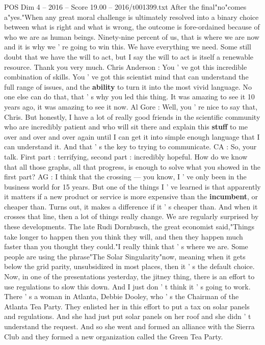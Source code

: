 \begin{textsample}{POS Dim 4 – 2016 – Score 19.00 – 2016/t001399.txt}
After the final"no"comes a"yes."When any great moral challenge is ultimately resolved into a binary choice between what is right and what is wrong, the outcome is fore-ordained because of who we are as human beings.
Ninety-nine percent of us, that is where we are now and it is why we ' re going to win this.
We have everything we need.
Some still doubt that we have the will to act, but I say the will to act is itself a renewable resource.
Thank you very much.
Chris Anderson : You ' ve got this incredible combination of skills.
You ' ve got this scientist mind that can understand the full range of issues, and the \textbf{ability} to turn it into the most vivid language.
No one else can do that, that ' s why you led this thing.
It was amazing to see it 10 years ago, it was amazing to see it now.
Al Gore : Well, you ' re nice to say that, Chris.
But honestly, I have a lot of really good friends in the scientific community who are incredibly patient and who will sit there and explain this \textbf{stuff} to me over and over and over again until I can get it into simple enough language that I can understand it.
And that ' s the key to trying to communicate.
CA : So, your talk.
First part : terrifying, second part : incredibly hopeful.
How do we know that all those graphs, all that progress, is enough to solve what you showed in the first part?
AG : I think that the crossing — you know, I ' ve only been in the business world for 15 years.
But one of the things I ' ve learned is that apparently it matters if a new product or service is more expensive than the \textbf{incumbent}, or cheaper than.
Turns out, it makes a difference if it ' s cheaper than.
And when it crosses that line, then a lot of things really change.
We are regularly surprised by these developments.
The late Rudi Dornbusch, the great economist said,"Things take longer to happen then you think they will, and then they happen much faster than you thought they could."I really think that ' s where we are.
Some people are using the phrase"The Solar Singularity"now, meaning when it gets below the grid parity, unsubsidized in most places, then it ' s the default choice.
Now, in one of the presentations yesterday, the jitney thing, there is an effort to use regulations to slow this down.
And I just don ' t think it ' s going to work.
There ' s a woman in Atlanta, Debbie Dooley, who ' s the Chairman of the Atlanta Tea Party.
They enlisted her in this effort to put a tax on solar panels and regulations.
And she had just put solar panels on her roof and she didn ' t understand the request.
And so she went and formed an alliance with the Sierra Club and they formed a new organization called the Green Tea Party.

\end{textsample}

